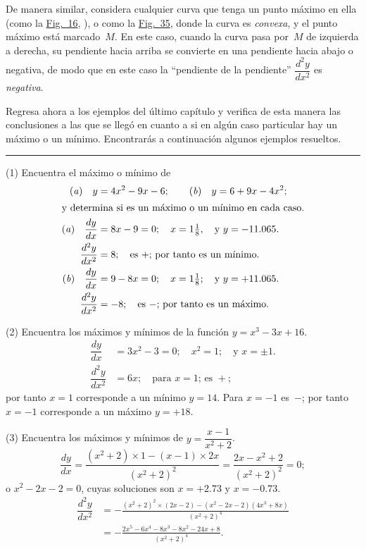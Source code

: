 \documentclass[12pt]{book}[2005/09/16]
\newcommand{\DPPageSep}[2]{\Pagelabel{#2}}
\newcommand{\Pagelabel}[1]
  {\phantomsection\label{#1}}
\newcommand{\Pageref}[2][p.]{%
  \ifthenelse{\not\equal{#1}{}}{%
    \hyperref[#2]{#1~\pageref{#2}}%
  }{%
    \hyperref[#2]{\pageref{#2}}%
  }%
}
\newcommand{\Fig}[1]{\hyperref[fig:#1]{Fig.~#1}}
\newcommand{\tb}[1][1.5in]{%
  \pagebreak[0]\par{\centering\rule{#1}{0.5pt}\pagebreak[3]\par}%
}
\newcommand{\DPtypo}[2]{#2}%
\begin{document}
De manera similar, considera cualquier curva que tenga un punto
máximo en ella (como la \Fig{16}, \Pageref{fig:16}), o como la \Fig{35}, donde %
la curva es \emph{convexa}, y el punto máximo está
marcado~$M$. En este caso, cuando la curva pasa por~$M$
de izquierda a derecha, su pendiente hacia arriba se convierte
\DPPageSep{127.png}{115}%
en una pendiente hacia abajo o negativa, de modo que en este
caso la ``pendiente de la pendiente'' $\dfrac{d^2y}{dx^2}$ es \emph{negativa}.

Regresa ahora a los ejemplos del último capítulo
y verifica de esta manera las conclusiones a las que se llegó en cuanto a
si en algún caso particular hay un máximo
o un mínimo. Encontrarás a continuación algunos ejemplos
resueltos.

\tb

(1) Encuentra el máximo o mínimo de
\begin{align*}
\text{(\textit{a})}\quad y &= 4x^2-9x-6; \qquad \text{(\textit{b})}\quad y = 6 + 9x-4x^2; \\
\intertext{y determina si es un máximo o un mínimo en
cada caso.}
\text{(\textit{a})}\quad \dfrac{dy}{dx}
  &= 8x-9=0;\quad x=1\tfrac{1}{8},\quad \text{y } y = -11.065.\\
%
\dfrac{d^2y}{dx^2}
  &= 8;\quad \text{es~$+$; por tanto es un mínimo.} \\
%
\text{(\textit{b})}\quad \DPtypo{\dfrac{dx}{dy}}{\dfrac{dy}{dx}}
  &= 9-8x=0;\quad x = 1\tfrac{1}{8};\quad \text{y } y = +11.065.\\
%
\dfrac{d^2y}{dx^2}
  &= -8;\quad \text{es~$-$; por tanto es un máximo.}
\end{align*}

(2) Encuentra los máximos y mínimos de la función
$y = x^3-3x+16$.
\begin{align*}
\dfrac{dy}{dx}
  &= 3x^2 - 3 = 0;\quad x^2 = 1;\quad \text{y } x = ±1.\\
%
\dfrac{d^2y}{dx^2}
  &= 6x;\quad \text{para $x = 1$; es~$+$};
\end{align*}
por tanto $x=1$ corresponde a un mínimo $y=14$. Para
$x=-1$ es~$-$; por tanto $x=-1$ corresponde a un máximo
$y=+18$.
\DPPageSep{128.png}{116}%

(3) Encuentra los máximos y mínimos de $y=\dfrac{x-1}{x^2+2}$.
\[
\frac{dy}{dx} = \frac{(x^2+2) × 1 - (x-1) × 2x}{(x^2+2)^2}
  = \frac{2x - x^2 + 2}{(x^2 + 2)^2} = 0;
\]
o $x^2 - 2x - 2 = 0$, cuyas soluciones son $x =+2.73$ y
$x=-0.73$.
\begin{align*}
\dfrac{d^2y}{dx^2}
  &= - \frac{(x^2 + 2)^2 × (2x-2) - (x^2 - 2x - 2)(4x^3 + 8x)}{(x^2 + 2)^4} \\
  &= - \frac{2x^5 - 6x^4 - 8x^3 - 8x^2 - 24x + 8}{(x^2 + 2)^4}.
\end{align*}
\end{document}
